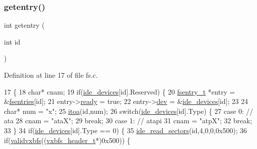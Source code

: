 \subsubsection{\texorpdfstring{getentry()}{getentry()}}
{\footnotesize\ttfamily int getentry (\begin{DoxyParamCaption}\item[{int}]{id }\end{DoxyParamCaption})}



Definition at line 17 of file fs.\+c.


\begin{DoxyCode}
17                      \{
18     \textcolor{keywordtype}{char}* cnam;
19     \textcolor{keywordflow}{if}(\hyperlink{a00026_ab97a828ed4839b575dc382e2bf826e87_ab97a828ed4839b575dc382e2bf826e87}{ide\_devices}[\textcolor{keywordtype}{id}].Reserved) \{
20         \hyperlink{a00226}{fsentry\_t} *entry = &\hyperlink{a00128_a6b46131164b26e476762930c9aae4319_a6b46131164b26e476762930c9aae4319}{fsentries}[id];
21         entry->\hyperlink{a00226_a284522ed97fe1eeebd0fcc039b2ea00a_a284522ed97fe1eeebd0fcc039b2ea00a}{ready} = \textcolor{keyword}{true};
22         entry->\hyperlink{a00226_aaea66ea744fa50f1c54666033884d8d2_aaea66ea744fa50f1c54666033884d8d2}{dev} = &\hyperlink{a00026_ab97a828ed4839b575dc382e2bf826e87_ab97a828ed4839b575dc382e2bf826e87}{ide\_devices}[id];
23         
24         \textcolor{keywordtype}{char}* num = \textcolor{stringliteral}{"x"};
25         \hyperlink{a00104_af749add1ff19b6ff96a62f35ebb49b7e_af749add1ff19b6ff96a62f35ebb49b7e}{itoa}(\textcolor{keywordtype}{id},num);
26         \textcolor{keywordflow}{switch}(\hyperlink{a00026_ab97a828ed4839b575dc382e2bf826e87_ab97a828ed4839b575dc382e2bf826e87}{ide\_devices}[\textcolor{keywordtype}{id}].Type) \{
27             \textcolor{keywordflow}{case} 0: \textcolor{comment}{// ata}
28                 cnam = \textcolor{stringliteral}{"ataX"};
29                 \textcolor{keywordflow}{break};
30             \textcolor{keywordflow}{case} 1: \textcolor{comment}{// atapi}
31                 cnam = \textcolor{stringliteral}{"atpX"};
32                 \textcolor{keywordflow}{break};
33         \}
34         \textcolor{keywordflow}{if}(\hyperlink{a00026_ab97a828ed4839b575dc382e2bf826e87_ab97a828ed4839b575dc382e2bf826e87}{ide\_devices}[\textcolor{keywordtype}{id}].Type == 0) \{
35             \hyperlink{a00023_a9dd84843412753d236e17a15277c5b98_a9dd84843412753d236e17a15277c5b98}{ide\_read\_sectors}(\textcolor{keywordtype}{id},4,0,0,0x500);
36             \textcolor{keywordflow}{if}(\hyperlink{a00161_a078a66e7d52fd4a6df768277b605199c_a078a66e7d52fd4a6df768277b605199c}{validvxbfs}((\hyperlink{a00266}{vxbfs\_header\_t}*)0x500)) \{

\end{DoxyCode}
